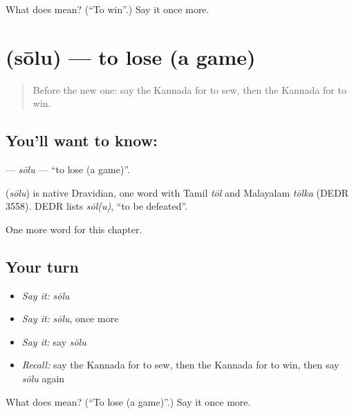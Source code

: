 \begin{tcolorbox}[breakable,colback=teal!4,colframe=teal!35!black,title={Before you move on}]
What does  mean? (\textquotedblleft{}To win\textquotedblright{}.) Say it once more.
\end{tcolorbox}
\section[\texorpdfstring{\kn{ಸೋಲು} (sōlu)}{ಸೋಲು (sōlu)}]{ (sōlu) — to lose (a game)}

\label{lesson:KA-C151-solu}



\begin{quote}
Before the new one: say the Kannada for to sew, then the Kannada for to win.
\end{quote}

\subsection*{You'll want to know: }
\textbf{} — \emph{sōlu} — \textquotedblleft{}to lose (a game)\textquotedblright{}.

\begin{cousinweb}
\textbf{} (\emph{sōlu}) is native Dravidian, one word with Tamil \emph{tōl} and Malayalam \emph{tōlka} (DEDR 3558). DEDR lists \emph{sōl(u)}, \textquotedblleft{}to be defeated\textquotedblright{}.
\end{cousinweb}

\begin{grammarlens}[title={What you've built}]
One more word for this chapter.
\end{grammarlens}

\subsection*{Your turn}
\begin{itemize}
\raggedright
  \item \emph{Say it:} \emph{sōlu}
  \item \emph{Say it:} \emph{sōlu}, once more
  \item \emph{Say it:} say \emph{sōlu}
  \item \emph{Recall:} say the Kannada for to sew, then the Kannada for to win, then say \emph{sōlu} again
\end{itemize}

\begin{tcolorbox}[breakable,colback=teal!4,colframe=teal!35!black,title={Before you move on}]
What does  mean? (\textquotedblleft{}To lose (a game)\textquotedblright{}.) Say it once more.
\end{tcolorbox}
